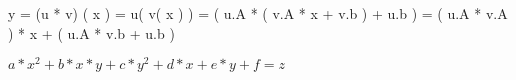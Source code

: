 \documentclass{article}
\begin{document}
 y = (u * v) ( x ) = u( v( x ) ) = ( u.A * ( v.A * x + v.b ) + u.b ) = ( u.A * v.A ) * x + ( u.A * v.b + u.b ) 
\pagebreak

$ a*x^2 + b*x*y + c*y^2 + d*x + e*y + f = z $
\pagebreak
\end{document}
